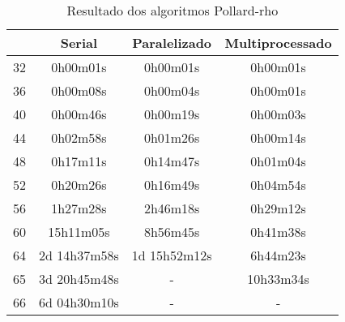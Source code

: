 \begin{table}[h]
\centering
\label{table:results}
\begin{tabular}{|l|c|c|c|}
\hline
\rowcolor[gray]{0.9}
\multicolumn{1}{|c|}{\(bits\)} & \textbf{Serial} & \textbf{Paralelizado} & \textbf{Multiprocessado} \\ \hline
32                             & 0h00m01s        & 0h00m01s              & 0h00m01s                 \\ \hline
36                             & 0h00m08s        & 0h00m04s              & 0h00m01s                 \\ \hline
40                             & 0h00m46s        & 0h00m19s              & 0h00m03s                 \\ \hline
44                             & 0h02m58s        & 0h01m26s              & 0h00m14s                 \\ \hline
48                             & 0h17m11s        & 0h14m47s              & 0h01m04s                 \\ \hline
52                             & 0h20m26s        & 0h16m49s              & 0h04m54s                 \\ \hline
56                             & 1h27m28s        & 2h46m18s              & 0h29m12s                 \\ \hline
60                             & 15h11m05s       & 8h56m45s              & 0h41m38s                 \\ \hline
64                             & 2d 14h37m58s    & 1d 15h52m12s          & 6h44m23s                 \\ \hline
65                             & 3d 20h45m48s    & -                     & 10h33m34s                \\ \hline
66                             & 6d 04h30m10s    & -                     & -                        \\ \hline
\end{tabular}
\caption{Resultado dos algoritmos Pollard-rho}
\end{table}
